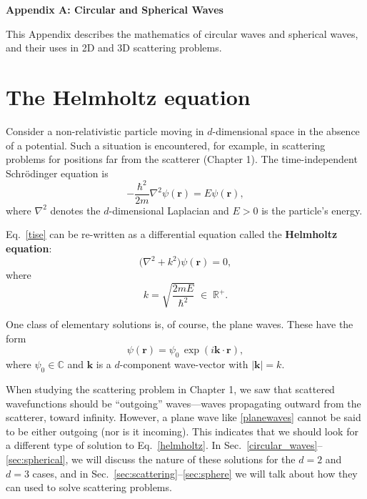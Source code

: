 \documentclass[pra,12pt]{revtex4-2}
\begin{document}
\begin{center}
{\large \textbf{Appendix A: Circular and Spherical Waves}}
\end{center}

This Appendix describes the mathematics of circular waves and
spherical waves, and their uses in 2D and 3D scattering problems.

\section{The Helmholtz equation}
\label{sec:helmholtz}

Consider a non-relativistic particle moving in $d$-dimensional space
in the absence of a potential.  Such a situation is encountered, for
example, in scattering problems for positions far from the scatterer
(Chapter 1).  The time-independent Schr\"odinger equation is
\begin{equation}
  -\frac{\hbar^2}{2m}\nabla^2 \psi(\mathbf{r}) = E \psi(\mathbf{r}),
  \label{tise}
\end{equation}
where $\nabla^2$ denotes the $d$-dimensional Laplacian and $E > 0$ is
the particle's energy.

Eq.~\eqref{tise} can be re-written as a differential equation called
the \textbf{Helmholtz equation}:
\begin{equation}
  \Big(\nabla^2 + k^2\Big) \psi(\mathbf{r}) = 0,
  \label{helmholtz}
\end{equation}
where
\begin{equation}
  k = \sqrt{\frac{2mE}{\hbar^2}} \;\in\; \mathbb{R}^+.
  \label{kparm}
\end{equation}

One class of elementary solutions is, of course, the plane waves.
These have the form
\begin{equation}
  \psi(\mathbf{r}) = \psi_0 \, \exp\left(i\mathbf{k}\cdot\mathbf{r}\right),
  \label{planewaves}
\end{equation}
where $\psi_0 \in \mathbb{C}$ and $\mathbf{k}$ is a $d$-component
wave-vector with $|\mathbf{k}| = k$.

When studying the scattering problem in Chapter 1, we saw that
scattered wavefunctions should be ``outgoing'' waves---waves
propagating outward from the scatterer, toward infinity.  However, a
plane wave like \eqref{planewaves} cannot be said to be either
outgoing (nor is it incoming).  This indicates that we should look for
a different type of solution to Eq.~\eqref{helmholtz}.  In
Sec.~\ref{circular_waves}--\ref{sec:spherical}, we will discuss the
nature of these solutions for the $d=2$ and $d=3$ cases, and in
Sec.~\ref{sec:scattering}--\ref{sec:sphere} we will talk about how
they can used to solve scattering problems.
\end{document}
